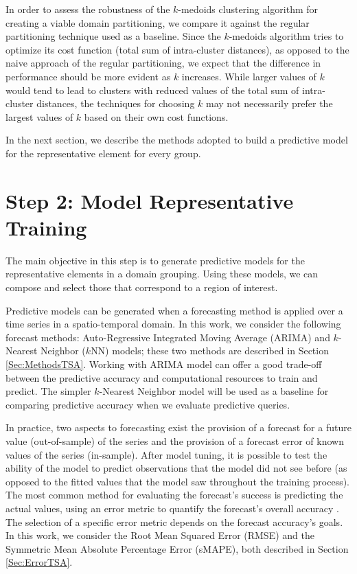 In order to assess the robustness of the $k$-medoids clustering algorithm for creating a viable domain partitioning, we compare it against the regular partitioning technique used as a baseline. Since the $k$-medoids algorithm tries to optimize its cost function (total sum of intra-cluster distances), as opposed to the naive approach of the regular partitioning, we expect that the difference in performance should be more evident as $k$ increases. While larger values of $k$ would tend to lead to clusters with reduced values of the total sum of intra-cluster distances, the techniques for choosing $k$ may not necessarily prefer the largest values of $k$ based on their own cost functions.

In the next section, we describe the methods adopted to build a predictive model for the representative element for every group.

\section{Step 2: Model Representative Training}
\label{Sec:ModelRepresentatives}

The main objective in this step is to generate predictive models for the representative elements in a domain grouping. Using these models, we can compose and select those that correspond to a region of interest.

Predictive models can be generated when a forecasting method is applied over a time series in a spatio-temporal domain. In this work, we consider the following forecast methods: Auto-Regressive Integrated Moving Average (ARIMA) and $k$-Nearest Neighbor ($k$NN) models; these two methods are described in Section \ref{Sec:MethodsTSA}. Working with ARIMA model can offer a good trade-off between the predictive accuracy and computational resources to train and predict. The simpler $k$-Nearest Neighbor model will be used as a baseline for comparing predictive accuracy when we evaluate predictive queries.

In practice, two aspects to forecasting exist the provision of a forecast for a future value (out-of-sample) of the series and the provision of a forecast error of known values of the series (in-sample). After model tuning, it is possible to test the ability of the model to predict observations that the model did not see before (as opposed to the fitted values that the model saw throughout the training process). The most common method for evaluating the forecast's success is predicting the actual values, using an error metric to quantify the forecast's overall accuracy \cite{Hyndman2006}. The selection of a specific error metric depends on the forecast accuracy's goals. In this work, we consider the Root Mean Squared Error (RMSE) and the Symmetric Mean Absolute Percentage Error (sMAPE), both described in Section \ref{Sec:ErrorTSA}.

